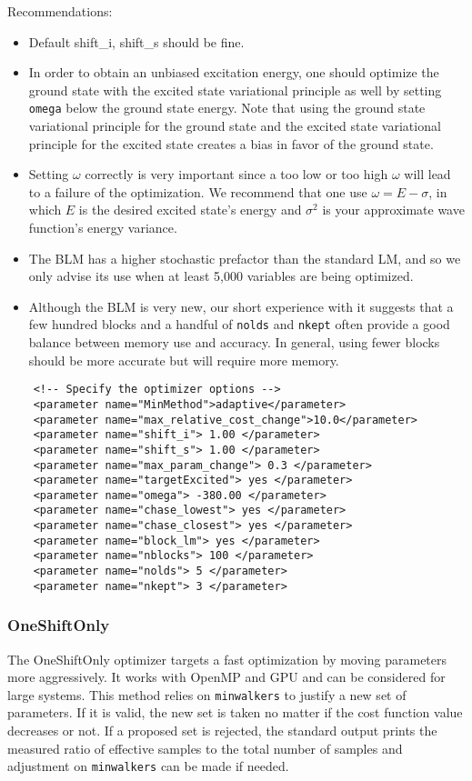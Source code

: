 Recommendations:
\begin{itemize}
  \item Default shift\_i, shift\_s should be fine. 
  \item In order to obtain an unbiased excitation energy, one should optimize the ground state with the excited state variational principle as well by setting
        \texttt{omega} below the ground state energy.  Note that using the ground state variational principle for the ground state and the excited state variational
        principle for the excited state creates a bias in favor of the ground state. 
  \item Setting $\omega$ correctly is very important since a too low or too high $\omega$ will lead to a failure of the optimization. We recommend that one use
        $\omega=E-\sigma$, in which $E$ is the desired excited state's energy and $\sigma^2$ is your approximate wave function's energy variance.
  \item The BLM has a higher stochastic prefactor than the standard LM, and so we only advise its use when at least 5,000 variables are being optimized.
  \item Although the BLM is very new, our short experience with it suggests that a few hundred blocks and a handful of \texttt{nolds} and \texttt{nkept}
        often provide a good balance between memory use and accuracy.  In general, using fewer blocks should be more accurate but will require more memory.
\end{itemize}

\begin{lstlisting}
    <!-- Specify the optimizer options -->
    <parameter name="MinMethod">adaptive</parameter>
    <parameter name="max_relative_cost_change">10.0</parameter>
    <parameter name="shift_i"> 1.00 </parameter>
    <parameter name="shift_s"> 1.00 </parameter>
    <parameter name="max_param_change"> 0.3 </parameter>
    <parameter name="targetExcited"> yes </parameter>
    <parameter name="omega"> -380.00 </parameter>
    <parameter name="chase_lowest"> yes </parameter>
    <parameter name="chase_closest"> yes </parameter>
    <parameter name="block_lm"> yes </parameter>
    <parameter name="nblocks"> 100 </parameter>
    <parameter name="nolds"> 5 </parameter>
    <parameter name="nkept"> 3 </parameter>
\end{lstlisting}

\subsubsection{OneShiftOnly}
The OneShiftOnly optimizer targets a fast optimization by moving parameters more aggressively. It works with OpenMP and GPU and can be considered for large systems.
This method relies on \texttt{minwalkers} to justify a new set of parameters. If it is valid, the new set is taken no matter if the cost function value decreases or not.
If a proposed set is rejected, the standard output prints the measured ratio of effective samples to the total number of samples
and adjustment on \texttt{minwalkers} can be made if needed.

